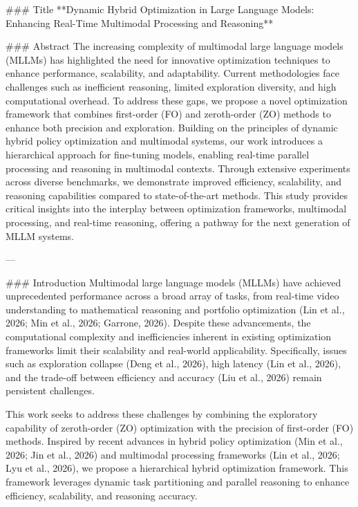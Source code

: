 ### Title
**Dynamic Hybrid Optimization in Large Language Models: Enhancing Real-Time Multimodal Processing and Reasoning**

### Abstract
The increasing complexity of multimodal large language models (MLLMs) has highlighted the need for innovative optimization techniques to enhance performance, scalability, and adaptability. Current methodologies face challenges such as inefficient reasoning, limited exploration diversity, and high computational overhead. To address these gaps, we propose a novel optimization framework that combines first-order (FO) and zeroth-order (ZO) methods to enhance both precision and exploration. Building on the principles of dynamic hybrid policy optimization and multimodal systems, our work introduces a hierarchical approach for fine-tuning models, enabling real-time parallel processing and reasoning in multimodal contexts. Through extensive experiments across diverse benchmarks, we demonstrate improved efficiency, scalability, and reasoning capabilities compared to state-of-the-art methods. This study provides critical insights into the interplay between optimization frameworks, multimodal processing, and real-time reasoning, offering a pathway for the next generation of MLLM systems.

---

### Introduction
Multimodal large language models (MLLMs) have achieved unprecedented performance across a broad array of tasks, from real-time video understanding to mathematical reasoning and portfolio optimization (Lin et al., 2026; Min et al., 2026; Garrone, 2026). Despite these advancements, the computational complexity and inefficiencies inherent in existing optimization frameworks limit their scalability and real-world applicability. Specifically, issues such as exploration collapse (Deng et al., 2026), high latency (Lin et al., 2026), and the trade-off between efficiency and accuracy (Liu et al., 2026) remain persistent challenges.

This work seeks to address these challenges by combining the exploratory capability of zeroth-order (ZO) optimization with the precision of first-order (FO) methods. Inspired by recent advances in hybrid policy optimization (Min et al., 2026; Jin et al., 2026) and multimodal processing frameworks (Lin et al., 2026; Lyu et al., 2026), we propose a hierarchical hybrid optimization framework. This framework leverages dynamic task partitioning and parallel reasoning to enhance efficiency, scalability, and reasoning accuracy.

